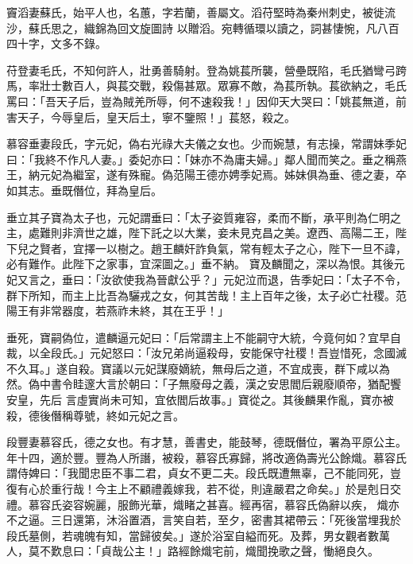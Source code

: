 \begin{pinyinscope}
 竇滔妻蘇氏，始平人也，名蕙，字若蘭，善屬文。滔苻堅時為秦州刺史，被徙流沙，蘇氏思之，織錦為回文旋圖詩
 以贈滔。宛轉循環以讀之，詞甚悽惋，凡八百四十字，文多不錄。



 苻登妻毛氏，不知何許人，壯勇善騎射。登為姚萇所襲，營壘既陷，毛氏猶彎弓跨馬，率壯士數百人，與萇交戰，殺傷甚眾。眾寡不敵，為萇所執。萇欲納之，毛氏罵曰：「吾天子后，豈為賊羌所辱，何不速殺我！」因仰天大哭曰：「姚萇無道，前害天子，今辱皇后，皇天后土，寧不鑒照！」萇怒，殺之。



 慕容垂妻段氏，字元妃，偽右光祿大夫儀之女也。少而婉慧，有志操，常謂妹季妃曰：「我終不作凡人妻。」委妃亦曰：「妹亦不為庸夫婦。」鄰人聞而笑之。垂之稱燕王，納元妃為繼室，遂有殊寵。偽范陽王德亦娉季妃焉。姊妹俱為垂、德之妻，卒如其志。垂既僭位，拜為皇后。



 垂立其子寶為太子也，元妃謂垂曰：「太子姿質雍容，柔而不斷，承平則為仁明之主，處難則非濟世之雄，陛下託之以大業，妾未見克昌之美。遼西、高陽二王，陛下兒之賢者，宜擇一以樹之。趙王麟奸詐負氣，常有輕太子之心，陛下一旦不諱，必有難作。此陛下之家事，宜深圖之。」垂不納。
 寶及麟聞之，深以為恨。其後元妃又言之，垂曰：「汝欲使我為晉獻公乎？」元妃泣而退，告季妃曰：「太子不令，群下所知，而主上比吾為驪戎之女，何其苦哉！主上百年之後，太子必亡社稷。范陽王有非常器度，若燕祚未終，其在王乎！」



 垂死，寶嗣偽位，遣麟逼元妃曰：「后常謂主上不能嗣守大統，今竟何如？宜早自裁，以全段氏。」元妃怒曰：「汝兄弟尚逼殺母，安能保守社稷！吾豈惜死，念國滅不久耳。」遂自殺。寶議以元妃謀廢嫡統，無母后之道，不宜成喪，群下咸以為然。偽中書令眭邃大言於朝曰：「子無廢母之義，漢之安思閻后親廢順帝，猶配饗安皇，先后
 言虛實尚未可知，宜依閻后故事。」寶從之。其後麟果作亂，寶亦被殺，德後僭稱尊號，終如元妃之言。



 段豐妻慕容氏，德之女也。有才慧，善書史，能鼓琴，德既僭位，署為平原公主。年十四，適於豐。豐為人所譖，被殺，慕容氏寡歸，將改適偽壽光公餘熾。慕容氏謂侍婢曰：「我聞忠臣不事二君，貞女不更二夫。段氏既遭無辜，己不能同死，豈復有心於重行哉！今主上不顧禮義嫁我，若不從，則違嚴君之命矣。」於是剋日交禮。慕容氏姿容婉麗，服飾光華，熾睹之甚喜。經再宿，慕容氏偽辭以疾，
 熾亦不之逼。三日還第，沐浴置酒，言笑自若，至夕，密書其裙帶云：「死後當埋我於段氏墓側，若魂魄有知，當歸彼矣。」遂於浴室自縊而死。及葬，男女觀者數萬人，莫不歎息曰：「貞哉公主！」路經餘熾宅前，熾聞挽歌之聲，慟絕良久。




\end{pinyinscope}
